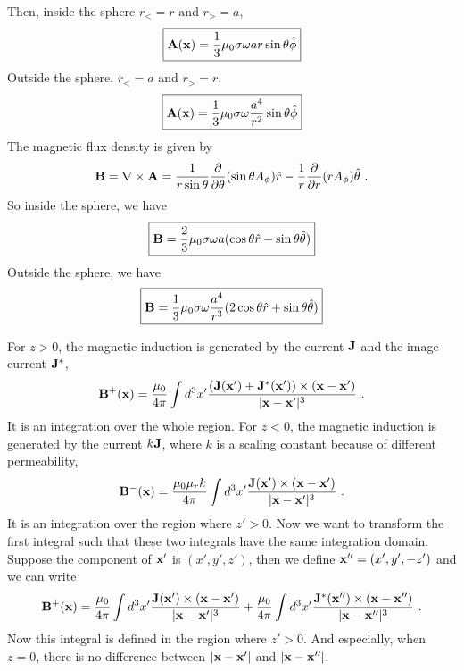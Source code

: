\documentclass[12pt]{article}
\newcommand{\x}{{\bf x}}
\newcommand{\B}{{\bf B}}
\newcommand{\bJ}{{\bf J}}
\newcommand{\A}{{\bf A}}
\begin{document}
Then, inside the sphere $r_< = r$ and $r_> = a$,
\begin{equation}
    \boxed{
    \A(\x) = \frac{1}{3} \mu_0 \sigma \omega a r \sin\theta \hat{\phi}}
\end{equation}
Outside the sphere, $r_< = a$ and $r_> = r$,
\begin{equation}
    \boxed{
    \A(\x) = \frac{1}{3} \mu_0 \sigma \omega \frac{a^4}{r^2} \sin\theta \hat{\phi}}
\end{equation}
The magnetic flux density is given by
\begin{equation}
    \B = \nabla \times \A = \frac{1}{r \sin \theta} \frac{\partial }{\partial \theta}(\sin \theta A_\phi) \hat{r} - \frac{1}{r} \frac{\partial}{\partial r}(r A_\phi) \hat{\theta}~.
\end{equation}
So inside the sphere, we have
\begin{equation}
    \boxed{
    \B = \frac{2}{3} \mu_0 \sigma \omega a (\cos \theta \hat{r} - \sin \theta \hat{\theta})}
\end{equation}
Outside the sphere, we have
\begin{equation}
    \boxed{
        \B = \frac{1}{3} \mu_0 \sigma \omega \frac{a^4}{r^3} (2\cos \theta \hat{r} + \sin \theta \hat{\theta})
    }
\end{equation}


\newpage
{} For $z > 0$, the magnetic induction is generated by the current $\bJ$ and the image current $\bJ^*$,
\begin{equation}
    \B^+(\x) = \frac{\mu_0}{4\pi} \int d^3x' \frac{(\bJ(\x') + \bJ^*(\x')) \times (\x - \x')}{|\x - \x'|^3}~.
\end{equation}
It is an integration over the whole region.
For $z<0$, the magnetic induction is generated by the current $k \bJ$, where $k$ is a scaling constant because of different permeability,
\begin{equation}
    \B^-(\x) = \frac{\mu_0 \mu_r k}{4\pi} \int d^3 x' \frac{\bJ(\x') \times (\x - \x')}{|\x - \x'|^3}~.
\end{equation}
It is an integration over the region where $z' > 0$. Now we want to transform the first integral such that these two integrals have the same integration domain. Suppose the component of $\x'$ is $(x', y', z')$, then we define $\x'' = (x', y', -z')$ and we can write
\begin{equation}
    \B^+(\x) = \frac{\mu_0}{4\pi} \int d^3x' \frac{\bJ(\x') \times (\x - \x')}{|\x - \x'|^3} + \frac{\mu_0}{4\pi} \int d^3 x' \frac{\bJ^*(\x'') \times (\x - \x'')}{|\x - \x''|^3}~.
\end{equation}
Now this integral is defined in the region where $z' > 0$. And especially, when $z = 0$, there is no difference between $|\x - \x'|$ and $|\x - \x''|$.
\end{document}
